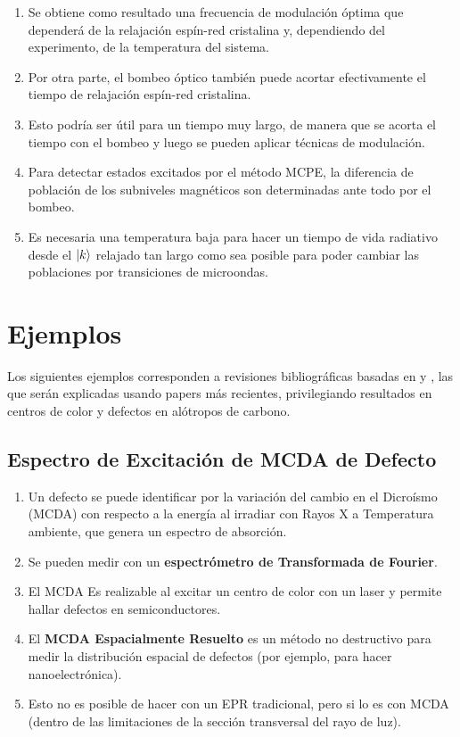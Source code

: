 \documentclass[aps,rmp,reprint,longbibliography]{revtex4-1}
\begin{document}
\begin{enumerate}
\item Se obtiene como resultado una frecuencia de modulación óptima que dependerá de la relajación espín-red cristalina y, dependiendo del experimento, de la temperatura del sistema. 
\item Por otra parte, el bombeo óptico también puede acortar efectivamente el tiempo de relajación espín-red cristalina. 
\item Esto podría ser útil para un tiempo muy largo, de manera que se acorta el tiempo con el bombeo y luego se pueden aplicar técnicas de modulación.
\item Para detectar estados excitados por el método MCPE, la diferencia de población de los subniveles magnéticos son determinadas ante todo por el bombeo. \item Es necesaria una temperatura baja para hacer un tiempo de vida radiativo desde el $\ket{k}$ relajado tan largo como sea posible para poder cambiar las poblaciones por transiciones de microondas. 
\end{enumerate}
\section{Ejemplos}

Los siguientes ejemplos corresponden a revisiones bibliográficas basadas en \cite{b1} y \cite{b2}, las que serán explicadas usando papers más recientes, privilegiando resultados en centros de color y defectos en alótropos de carbono.
\subsection{Espectro de Excitación de MCDA de Defecto}
\begin{enumerate}
\item Un defecto se puede identificar por la variación del cambio en el Dicroísmo (MCDA) con respecto a la energía al irradiar con Rayos X a Temperatura ambiente, que genera un espectro de absorción.
\item Se pueden medir con un \textbf{espectrómetro de Transformada de Fourier}. 
\item El MCDA Es realizable al excitar un centro de color con un laser y permite hallar defectos en semiconductores.
\item El \textbf{MCDA Espacialmente Resuelto} es un método no destructivo para medir la distribución espacial de defectos (por ejemplo, para hacer nanoelectrónica). 
\item Esto no es posible de hacer con un EPR tradicional, pero si lo es con MCDA (dentro de las limitaciones de la sección transversal del rayo de luz).
\end{enumerate}
\end{document}
